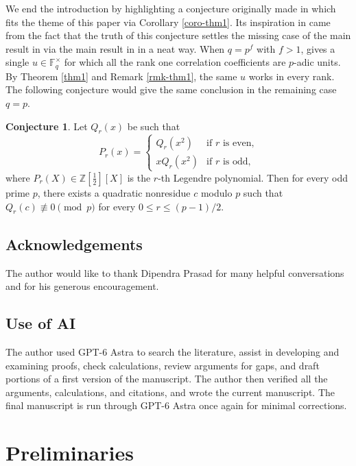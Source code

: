 \documentclass[12pt]{amsart}
\theoremstyle{definition}
\newtheorem{conjecture}[theorem]{Conjecture}
\theoremstyle{remark}
\begin{document}
We end the introduction by highlighting a conjecture originally made in \cite{ana25} which fits the theme of this paper via Corollary \ref{coro-thm1}. Its inspiration in \cite{ana25} came from the fact that the truth of this conjecture settles the missing case of the main result in \cite[\S 7.1]{bhko24} via the main result in \cite{ana25} in a neat way. When $q=p^f$ with $f>1$, \cite[Theorem 1.2]{ana25} gives a single $u\in\mathbb F_q^\times$ for which all the rank one correlation coefficients are $p$-adic units. By Theorem \ref{thm1} and Remark \ref{rmk-thm1}, the same $u$ works in every rank. The following conjecture would give the same conclusion in the remaining case $q=p$.

\begin{conjecture}\label{conj}
Let $Q_r(x)$ be such that 
\[
P_r(x) =
\begin{cases}
Q_r(x^2) &\text{if $r$ is even,} \\
xQ_r(x^2) &\text{if $r$ is odd,}  
\end{cases}
\]
where $P_r(X) \in \mathbb Z[\frac{1}{2}][X]$ is the $r$-th Legendre polynomial. Then
for every odd prime $p$, there exists a quadratic nonresidue $c$ modulo $p$ such that $Q_r(c)\not \equiv 0 \pmod p$ for every $0\le r\le(p-1)/2$. 
\end{conjecture}
 
\subsection*{Acknowledgements} 

The author would like to thank Dipendra Prasad for many helpful conversations and for his generous encouragement.

\subsection*{Use of AI} 
The author used GPT-6 Astra to search the literature, assist in developing and examining proofs, check calculations, review arguments for gaps, and draft portions of a first version of the manuscript. The author then verified all the arguments, calculations, and citations, and wrote the current manuscript. The final manuscript is run through GPT-6 Astra once again for minimal corrections. 

\section{Preliminaries}
\end{document}
